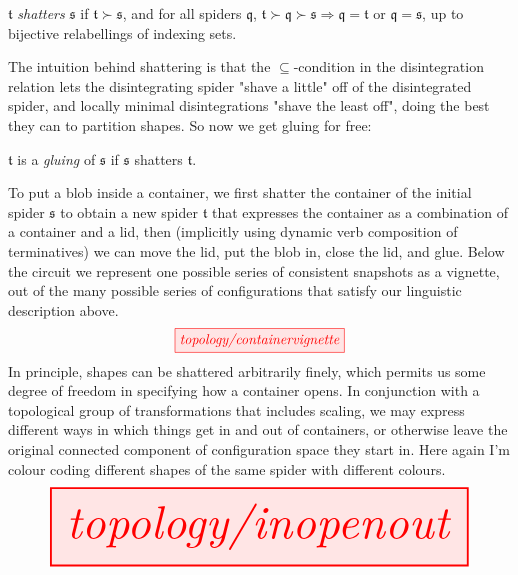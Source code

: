 \begin{defn}
$\mathfrak{t}$ \emph{shatters} $\mathfrak{s}$ if $\mathfrak{t} \succ \mathfrak{s}$, and for all spiders $\mathfrak{q}$, $\mathfrak{t} \succ \mathfrak{q} \succ \mathfrak{s} \Rightarrow \mathfrak{q} = \mathfrak{t}$ or $\mathfrak{q} = \mathfrak{s}$, up to bijective relabellings of indexing sets.
\end{defn}

The intuition behind shattering is that the $\subseteq$-condition in the disintegration relation lets the disintegrating spider "shave a little" off of the disintegrated spider, and locally minimal disintegrations "shave the least off", doing the best they can to partition shapes. So now we get gluing for free:

\begin{defn}
$\mathfrak{t}$ is a \emph{gluing} of $\mathfrak{s}$ if $\mathfrak{s}$ shatters $\mathfrak{t}$.
\end{defn}

\begin{example}
To put a blob inside a container, we first shatter the container of the initial spider $\mathfrak{s}$ to obtain a new spider $\mathfrak{t}$ that expresses the container as a combination of a container and a lid, then (implicitly using dynamic verb composition of terminatives) we can move the lid, put the blob in, close the lid, and glue. Below the circuit we represent one possible series of consistent snapshots as a vignette, out of the many possible series of configurations that satisfy our linguistic description above.
\[\tikzfig{topology/containervignette}\]
In principle, shapes can be shattered arbitrarily finely, which permits us some degree of freedom in specifying how a container opens. In conjunction with a topological group of transformations that includes scaling, we may express different ways in which things get in and out of containers, or otherwise leave the original connected component of configuration space they start in. Here again I'm colour coding different shapes of the same spider with different colours.
\[\resizebox{\textwidth}{!}{\tikzfig{topology/inopenout}}\]
\end{example}

